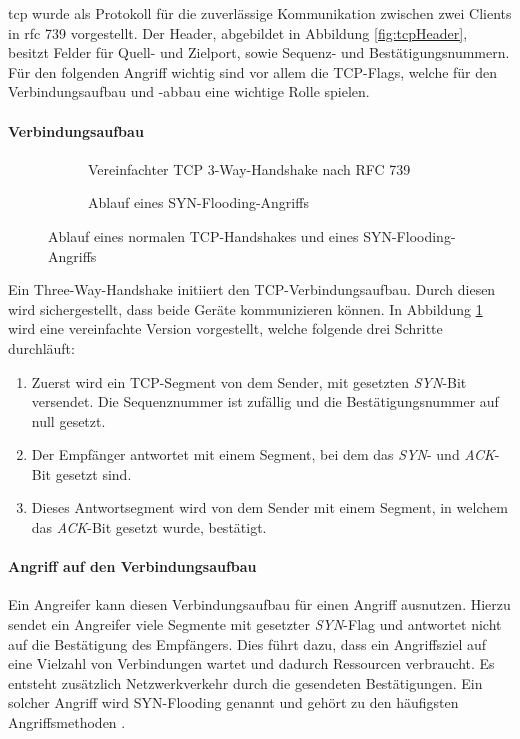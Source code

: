 \gls{tcp} wurde als Protokoll für die zuverlässige Kommunikation zwischen zwei Clients in \gls{rfc} 739 \cite{RFC0793} vorgestellt. Der Header, abgebildet in Abbildung \ref{fig:tcpHeader}, besitzt Felder für Quell- und Zielport, sowie Sequenz- und Bestätigungsnummern. Für den folgenden Angriff wichtig sind vor allem die TCP-Flags, welche \ua für den Verbindungsaufbau und -abbau eine wichtige Rolle spielen.

\paragraph{Verbindungsaufbau}
\begin{figure}[ht]
	\centering
	\begin{subfigure}[t]{0.5\textwidth}
		
		\caption{Vereinfachter TCP 3-Way-Handshake nach RFC  739 \cite{RFC0793}}
		\label{fig:tcpHandshake}
	\end{subfigure}%
	\begin{subfigure}[t]{0.5\textwidth}
		
		\caption{Ablauf eines SYN-Flooding-Angriffs}
		\label{fig:tcpSynFlood}
	\end{subfigure}
	\caption{Ablauf eines normalen TCP-Handshakes und eines SYN-Flooding-Angriffs}
	\label{fig:tcpHandshakeAndFlod}
\end{figure}
Ein Three-Way-Handshake initiiert den TCP-Verbindungsaufbau. Durch diesen wird sichergestellt, dass beide Geräte kommunizieren können. In Abbildung \ref{fig:tcpHandshake} wird eine vereinfachte Version vorgestellt, welche folgende drei Schritte durchläuft:
\begin{enumerate}
	\item Zuerst wird ein TCP-Segment von dem Sender, mit gesetzten \emph{SYN}-Bit versendet. Die Sequenznummer ist zufällig und die Bestätigungsnummer auf null gesetzt.
	\item Der Empfänger antwortet mit einem Segment, bei dem das \emph{SYN}- und \emph{ACK}-Bit gesetzt sind.
	\item Dieses Antwortsegment wird von dem Sender mit einem Segment, in welchem das \emph{ACK}-Bit gesetzt wurde, bestätigt. 
\end{enumerate}

\paragraph{Angriff auf den Verbindungsaufbau}
Ein Angreifer kann diesen Verbindungsaufbau für einen Angriff ausnutzen. Hierzu sendet ein Angreifer viele Segmente mit gesetzter \emph{SYN}-Flag und antwortet nicht auf die Bestätigung des Empfängers. Dies führt dazu, dass ein Angriffsziel auf eine Vielzahl von Verbindungen wartet und dadurch Ressourcen verbraucht. Es entsteht zusätzlich Netzwerkverkehr durch die gesendeten Bestätigungen. Ein solcher Angriff wird SYN-Flooding genannt und gehört zu den häufigsten Angriffsmethoden \cite{Yoachimik2020}.

